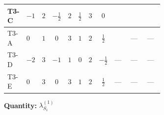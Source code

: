 \documentclass[8pt]{article}
\begin{document}
\begin{landscape}
\begin{longtable}{@{}llcccccc >{\raggedright\arraybackslash}p{0.21\linewidth} >{\raggedright\arraybackslash}p{0.21\linewidth} >{\raggedright\arraybackslash}p{0.21\linewidth}@{}}
\midrule
T3-C & $-1$ & $2$ & $-\frac{1}{2}$ & $2$ & $\frac{1}{2}$ & $3$ & $0$ & \scriptsize\adjustbox{max width=\linewidth}{$\begin{gathered} 6 {\lambda_{S_1}^{(1)}} T_{\nu}^{(1)}\end{gathered}$} & \scriptsize\adjustbox{max width=\linewidth}{$\begin{gathered} +{\lambda_{11}} (3 \operatorname{Tr}\!\left({y_1}\,\left({y_2}\right)^{\dagger}\right)+24 \left({\lambda_{11}}\right)^{*})\end{gathered}$} & \scriptsize\adjustbox{max width=\linewidth}{$\begin{gathered} +3 \left({\lambda_{11}}\right)^{*} \operatorname{Tr}\!\left({y_2}\,\left({y_1}\right)^{\dagger}\right)\end{gathered}$} \\
\midrule
T3-A & $0$ & $1$ & $0$ & $3$ & $1$ & $2$ & $\frac{1}{2}$ & \scriptsize\adjustbox{max width=\linewidth}{$\begin{gathered} 8 {\lambda_{S_1}^{(1)}} T_{\nu}^{(1)}\end{gathered}$} & --- & --- \\
\midrule
T3-D & $-2$ & $3$ & $-1$ & $1$ & $0$ & $2$ & $-\frac{1}{2}$ & --- & --- & --- \\
\midrule
T3-E & $0$ & $3$ & $0$ & $3$ & $1$ & $2$ & $\frac{1}{2}$ & --- & --- & --- \\
\midrule
\bottomrule
\end{longtable}
\clearpage
\noindent\textbf{Quantity: }$\lambda_{S_1}^{(1)}$\par\smallskip

\end{landscape}
\end{document}
